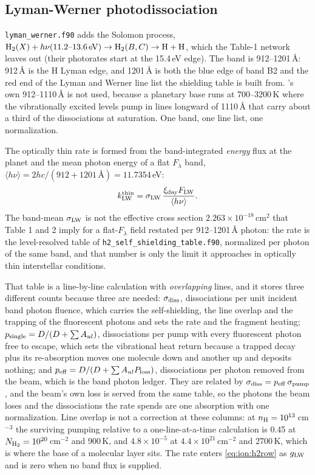 \subsection{Lyman-Werner photodissociation}
\label{sec:mol:lw}

\texttt{lyman\_werner.f90} adds the Solomon process,
${\rm H_2}(X)+h\nu(11.2\text{--}13.6\,{\rm eV})\to{\rm H_2}(B,C)\to{\rm H}+{\rm H}$,
which the \citeauthor{Koskinen2022} Table-1 network leaves out (their photorates start
at the 15.4\,eV edge). The band is 912--1201\,\AA{}: 912\,\AA{} is the H
Lyman edge, and 1201\,\AA{} is both the blue edge of band B2 and the red end
of the Lyman and Werner line list the shielding table is built from. \citeauthor{Draine1996}'s own 912--1110\,\AA{} is not used, because a planetary base runs
at 700--3200\,K where the vibrationally excited levels pump in lines longward
of 1110\,\AA{} that carry about a third of the dissociations at saturation.
One band, one line list, one normalization.

The optically thin rate is formed from the band-integrated \emph{energy}
flux at the planet and the mean photon energy of a flat $F_\lambda$ band,
$\langle h\nu\rangle = 2hc/(912+1201\,\mbox{\AA}) = 11.7354$\,eV:
\begin{equation}
k_{\rm LW}^{\rm thin} = \sigma_{\rm LW}\,
   \frac{\xi_{\rm day}F_{\rm LW}}{\langle h\nu\rangle}.
\label{eq:mol:klw}
\end{equation}
The band-mean $\sigma_{\rm LW}$ is not the effective cross section
$2.263\times10^{-18}$\,cm$^{2}$ that \citet{Draine1996} Table 1 and 2 imply
for a flat-$F_\lambda$ field restated per 912--1201\,\AA{} photon: the rate
is the level-resolved table of \texttt{h2\_self\_shielding\_table.f90},
normalized per photon of the same band, and that number is only the limit it
approaches in optically thin interstellar conditions.

That table is a line-by-line calculation with \emph{overlapping} lines, and
it stores three different counts because three are needed:
$\sigma_{\rm diss}$, dissociations per unit incident band photon fluence,
which carries the self-shielding, the line overlap and the trapping of the
fluorescent photons and sets the rate and the fragment heating;
$p_{\rm single} = D/(D+\sum A_{ul})$, dissociations per pump with every
fluorescent photon free to escape, which sets the vibrational heat return
because a trapped decay plus its re-absorption moves one molecule down and
another up and deposits nothing; and
$p_{\rm eff} = D/(D+\sum A_{ul}P_{\rm loss})$, dissociations per photon
removed from the beam, which is the band photon ledger. They are related by
$\sigma_{\rm diss} = p_{\rm eff}\,\sigma_{\rm pump}$, and the beam's own loss
is served from the same table, so the photons the beam loses and the
dissociations the rate spends are one absorption with one normalization.
Line overlap is not a correction at these columns: at
$n_{\rm H}=10^{13}$\,cm$^{-3}$ the surviving pumping relative to a
one-line-at-a-time calculation is 0.45 at $N_{\rm H_2}=10^{20}$\,cm$^{-2}$
and 900\,K, and $4.8\times10^{-5}$ at $4.4\times10^{21}$\,cm$^{-2}$ and
2700\,K, which is where the base of a molecular layer sits. The rate enters
\eqref{eq:ion:h2row} as $g_{\rm LW}$ and is zero when no band flux is
supplied.

